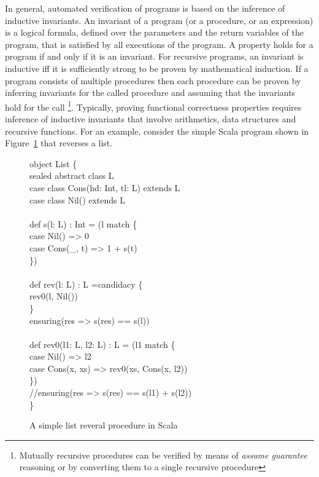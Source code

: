 In general, automated verification of programs is based on the inference of inductive invariants.
An invariant of a program (or a procedure, or an expression) is a logical formula, defined over the 
parameters and the return variables of the program, that is satisfied by all executions of the program. 
A property holds for a program if and only if it is an invariant. 
For recursive programs, an invariant is inductive iff it is sufficiently strong to be 
proven by mathematical induction. 
If a program consists of multiple procedures then each procedure can be proven by inferring invariants
for the called procedure and assuming that the invariants hold for the call 
\footnote{Mutually recursive procedures can be 
verified by means of \emph{assume guarantee} reasoning or by converting them 
to a single recursive procedure}.
Typically, proving functional correctness properties requires inference of inductive invariants
that involve arithmetics, data structures and recursive functions. 
For an example, consider the simple Scala program shown in Figure~\ref{fig:eg} that reverses a list. 
%
\begin{figure}
\begin{myprogram}
object List \{ \\
\pnl \>    sealed abstract class L \\
\pnl \>    case class Cons(hd: Int, tl: L) extends L \\
\pnl \>    case class Nil() extends L \\
\\
\pnl \>    def s(l: L) : Int = (l match \{ \\
\pnl \> \>      case Nil() => 0 \\
\pnl \> \>      case Cons(\_, t) => 1 + s(t) \\
\pnl \>    \}) \\
\\
\pnl \>    def rev(l: L) : L =candidacy \{ \\
\pnl \> \>      rev0(l, Nil())  \\
\pnl \>    \} \\
\pnl \>    ensuring(res => s(res) == s(l))\\
\\    
\pnl \>    def rev0(l1: L, l2: L) : L = (l1 match \{ \\
\pnl \> \>      case Nil() => l2 \\
\pnl \> \>     case Cons(x, xs) => rev0(xs, Cons(x, l2)) \\
\pnl \>    \}) \\ 
\pnl \>    //ensuring(res => s(res) == s(l1) + s(l2)) \\
\}
\end{myprogram}
\caption{A simple list reveral procedure in Scala} \label{fig:eg}
\end{figure}

